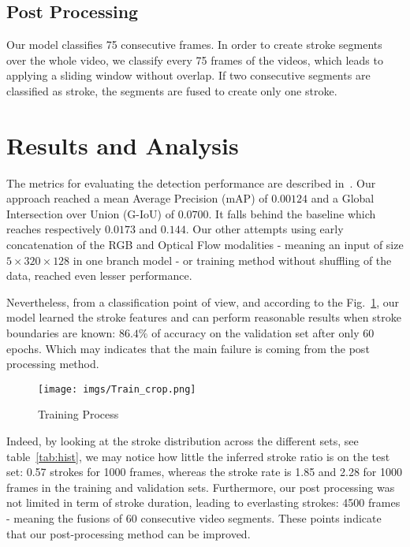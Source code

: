 \documentclass[sigconf]{acmart-me}
\begin{document}
\subsection{Post Processing}

Our model classifies 75 consecutive frames. In order to create stroke segments over the whole video, we classify every 75 frames of the videos, which leads to applying a sliding window without overlap. If two consecutive segments are classified as stroke, the segments are fused to create only one stroke.


\section{Results and Analysis}
\label{sec:res}
The metrics for evaluating the detection performance are described in~\cite{mediaeval/Martin21/task}. Our approach reached a mean Average Precision (mAP) of $0.00124$ and a Global Intersection over Union (G-IoU) of $0.0700$. It falls behind the baseline which reaches respectively $0.0173$ and $0.144$. Our other attempts using early concatenation of the RGB and Optical Flow modalities - meaning an input of size $5\times320\times128$ in one branch model - or training method without shuffling of the data, reached even lesser performance.

\par

Nevertheless, from a classification point of view, and according to the Fig.~\ref{fig:train}, our model learned the stroke features and can perform reasonable results when stroke boundaries are known: $86.4\%$ of accuracy on the validation set after only 60 epochs. Which may indicates that the main failure is coming from the post processing method.

\begin{figure}
 \centering
 \texttt{[image: imgs/Train\_crop.png]}
 \caption{Training Process}
 \label{fig:train}
\end{figure}

Indeed, by looking at the stroke distribution across the different sets, see table~\ref{tab:hist}, we may notice how little the inferred stroke ratio is on the test set: 0.57 strokes for 1000 frames, whereas the stroke rate is 1.85 and 2.28 for 1000 frames in the training and validation sets. Furthermore, our post processing was not limited in term of stroke duration, leading to everlasting strokes: 4500 frames - meaning the fusions of 60 consecutive video segments. These
points indicate that our post-processing method can be improved.
\end{document}
